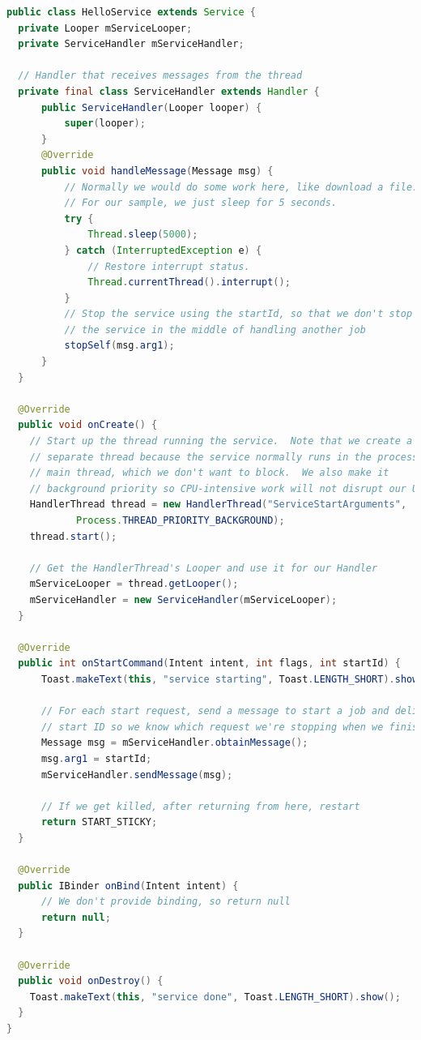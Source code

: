 \documentclass{book}
\begin{document}
\begin{lstlisting}[language=Java]
public class HelloService extends Service {
  private Looper mServiceLooper;
  private ServiceHandler mServiceHandler;

  // Handler that receives messages from the thread
  private final class ServiceHandler extends Handler {
      public ServiceHandler(Looper looper) {
          super(looper);
      }
      @Override
      public void handleMessage(Message msg) {
          // Normally we would do some work here, like download a file.
          // For our sample, we just sleep for 5 seconds.
          try {
              Thread.sleep(5000);
          } catch (InterruptedException e) {
              // Restore interrupt status.
              Thread.currentThread().interrupt();
          }
          // Stop the service using the startId, so that we don't stop
          // the service in the middle of handling another job
          stopSelf(msg.arg1);
      }
  }

  @Override
  public void onCreate() {
    // Start up the thread running the service.  Note that we create a
    // separate thread because the service normally runs in the process's
    // main thread, which we don't want to block.  We also make it
    // background priority so CPU-intensive work will not disrupt our UI.
    HandlerThread thread = new HandlerThread("ServiceStartArguments",
            Process.THREAD_PRIORITY_BACKGROUND);
    thread.start();

    // Get the HandlerThread's Looper and use it for our Handler
    mServiceLooper = thread.getLooper();
    mServiceHandler = new ServiceHandler(mServiceLooper);
  }

  @Override
  public int onStartCommand(Intent intent, int flags, int startId) {
      Toast.makeText(this, "service starting", Toast.LENGTH_SHORT).show();

      // For each start request, send a message to start a job and deliver the
      // start ID so we know which request we're stopping when we finish the job
      Message msg = mServiceHandler.obtainMessage();
      msg.arg1 = startId;
      mServiceHandler.sendMessage(msg);

      // If we get killed, after returning from here, restart
      return START_STICKY;
  }

  @Override
  public IBinder onBind(Intent intent) {
      // We don't provide binding, so return null
      return null;
  }

  @Override
  public void onDestroy() {
    Toast.makeText(this, "service done", Toast.LENGTH_SHORT).show();
  }
}
\end{lstlisting}
\end{document}
